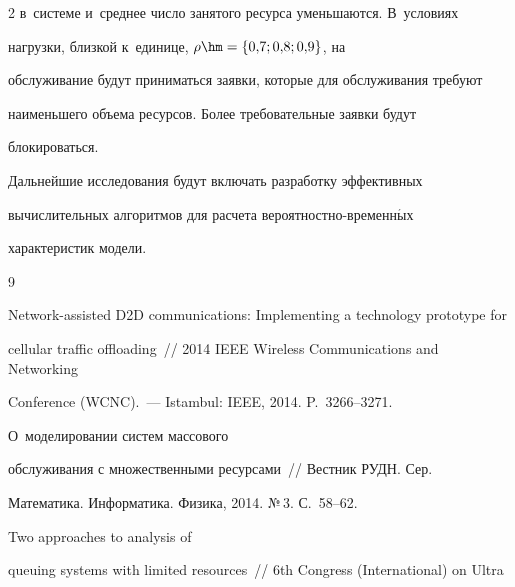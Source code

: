 \begin{multicols}{2}
в~системе и~среднее число занятого ресур\-са уменьшаются. В~условиях 

нагрузки, близкой к~единице, $\rho\hm= \{0{,}7; 0{,}8; 0{,}9\}$, на 

об\-слу\-жи\-ва\-ние будут приниматься заявки, которые для обслу\-жи\-ва\-ния требуют 

наименьшего объема ресурсов. Более требовательные заявки будут 

бло\-ки\-ро\-ваться. 

{



}

  

  Дальнейшие исследования будут включать разработку эффективных 

вычислительных алгоритмов для расчета ве\-ро\-ят\-ност\-но-вре\-мен\-н$\acute{\mbox{ы}}$х 

характеристик модели.

  

  

{\small\frenchspacing

 {%


 \begin{thebibliography}{9}

 



Network-assisted D2D communications: Implementing a technology prototype for 

cellular traffic offloading~// 2014 IEEE Wireless Communications and Networking 

Conference (WCNC).~--- Istambul: IEEE, 2014. P.~3266--3271.


 О~моделировании систем массового 

обслуживания с множественными ресурсами~// Вестник РУДН. Сер. 

Математика. Информатика. Физика, 2014. №\,3. С.~58--62.


 Two approaches to analysis of 

queuing systems with limited resources~// 6th Congress (International) on Ultra 


\end{thebibliography}}}
\end{multicols}
